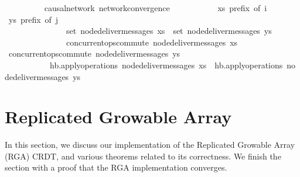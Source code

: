 \documentclass[acmlarge,review,anonymous]{acmart}\settopmatter{printfolios=true}
\begin{document}
\begin{isabellebody}
\ \ \ \ \ \ \ \  {\isacharparenleft}\ causal{\isacharunderscore}network{\isacharparenright}\ network{\isacharunderscore}convergence{\isacharcolon}\isanewline
\ \ \ \ \ \ \ \ \ \ \ {\isachardoublequoteopen}xs\ prefix\ of\ i{\isachardoublequoteclose} \ {\isachardoublequoteopen}ys\ prefix\ of\ j{\isachardoublequoteclose}\isanewline
\ \ \ \ \ \ \ \ \ \ \ \ \ \ \ {\isachardoublequoteopen}set\ {\isacharparenleft}node{\isacharunderscore}deliver{\isacharunderscore}messages\ xs{\isacharparenright}\ {\isacharequal}\ set\ {\isacharparenleft}node{\isacharunderscore}deliver{\isacharunderscore}messages\ ys{\isacharparenright}{\isachardoublequoteclose}\isanewline
\ \ \ \ \ \ \ \ \ \ \ \ \ \ \ {\isachardoublequoteopen}concurrent{\isacharunderscore}ops{\isacharunderscore}commute\ {\isacharparenleft}node{\isacharunderscore}deliver{\isacharunderscore}messages\ xs{\isacharparenright}{\isachardoublequoteclose} \ {\isachardoublequoteopen}concurrent{\isacharunderscore}ops{\isacharunderscore}commute\ {\isacharparenleft}node{\isacharunderscore}deliver{\isacharunderscore}messages\ ys{\isacharparenright}{\isachardoublequoteclose}\isanewline
\ \ \ \ \ \ \ \ \ \ \ {\isachardoublequoteopen}hb.apply{\isacharunderscore}operations\ {\isacharparenleft}node{\isacharunderscore}deliver{\isacharunderscore}messages\ xs{\isacharparenright}\ {\isacharequal}\ hb.apply{\isacharunderscore}operations\ {\isacharparenleft}node{\isacharunderscore}deliver{\isacharunderscore}messages\ ys{\isacharparenright}{\isachardoublequoteclose}
\end{isabellebody}


\section{Replicated Growable Array}
\label{sect.rga}

In this section, we discuss our implementation of the Replicated Growable Array (RGA) CRDT, and various theorems related to its correctness.
We finish the section with a proof that the RGA implementation converges.

\noindent
\end{document}
